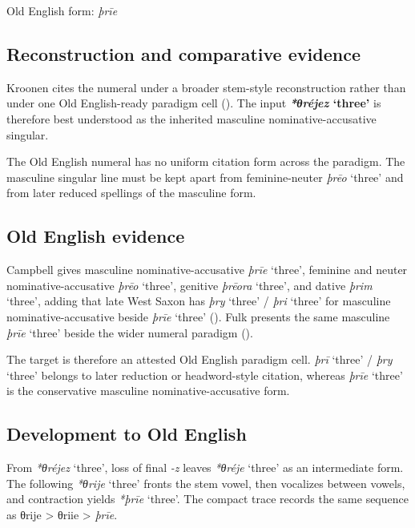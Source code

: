 \documentclass[
  british,
  a4paper,
  openany]{book}
\providecommand{\Recon}[1]{\emph{*#1}}
{\catcode`→=\active \global\def→{\ensuremath{\rightarrow}}}
\providecommand{\Recon}[1]{\emph{*#1}}
{\catcode`→=\active \global\def→{\ensuremath{\rightarrow}}}
\begin{document}
Old English form: \emph{þrīe}

\subsection{Reconstruction and comparative
evidence}\label{reconstruction-and-comparative-evidence-72}

Kroonen cites the numeral under a broader stem-style reconstruction
rather than under one Old English-ready paradigm cell
(). The input
\textbf{{\Recon{θréjez} `three'}} is therefore best understood as the
inherited masculine nominative-accusative singular.

The Old English numeral has no uniform citation form across the
paradigm. The masculine singular line must be kept apart from
feminine-neuter \emph{þrēo} `three' and from later reduced spellings of
the masculine form.

\subsection{Old English evidence}\label{old-english-evidence-72}

Campbell gives masculine nominative-accusative {\emph{þrīe}} `three',
feminine and neuter nominative-accusative {\emph{þrēo}} `three',
genitive {\emph{þrēora}} `three', and dative {\emph{þrim}} `three',
adding that late West Saxon has \emph{þry} `three' / \emph{þri} `three'
for masculine nominative-accusative beside {\emph{þrīe}} `three'
(). Fulk presents
the same masculine \emph{þrīe} `three' beside the wider numeral paradigm
().

The target is therefore an attested Old English paradigm cell.
\emph{þrī} `three' / \emph{þry} `three' belongs to later reduction or
headword-style citation, whereas {\emph{þrīe}} `three' is the
conservative masculine nominative-accusative form.

\subsection{Development to Old
English}\label{development-to-old-english-72}

From \Recon{θréjez} `three', loss of final \emph{-z} leaves
\Recon{θréje} `three' as an intermediate form. The following
\Recon{θrije} `three' fronts the stem vowel, then vocalizes between
vowels, and contraction yields \Recon{þrīe} `three'. The compact trace
records the same sequence as θrije \textgreater{} θriie \textgreater{}
\emph{þrīe}.
\end{document}

